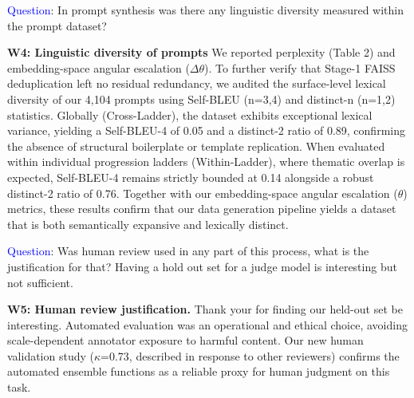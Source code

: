 \textcolor{blue}{Question}: In prompt synthesis was there any linguistic diversity measured within the prompt dataset?


\textbf{W4: Linguistic diversity of prompts} We reported perplexity (Table 2) and embedding-space angular escalation ($\Delta\theta$). To further verify that Stage-1 FAISS deduplication left no residual redundancy, we audited the surface-level lexical diversity of our 4,104 prompts using Self-BLEU (n=3,4) and distinct-n (n=1,2) statistics. Globally (Cross-Ladder), the dataset exhibits exceptional lexical variance, yielding a Self-BLEU-4 of 0.05 and a distinct-2 ratio of 0.89, confirming the absence of structural boilerplate or template replication. When evaluated within individual progression ladders (Within-Ladder), where thematic overlap is expected, Self-BLEU-4 remains strictly bounded at 0.14 alongside a robust distinct-2 ratio of 0.76. Together with our embedding-space angular escalation ($\theta$) metrics, these results confirm that our data generation pipeline yields a dataset that is both semantically expansive and lexically distinct.





\textcolor{blue}{Question}: Was human review used in any part of this process, what is the justification for that? Having a hold out set for a judge model is interesting but not sufficient.


\textbf{W5: Human review justification.} Thank your for finding our held-out set be interesting. Automated evaluation was an operational and ethical choice, avoiding scale-dependent annotator exposure to harmful content. Our new human validation study ($\kappa$=0.73, described in response to other reviewers) confirms the automated ensemble functions as a reliable proxy for human judgment on this task.

